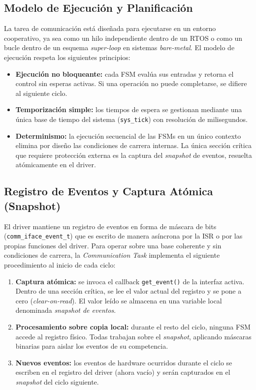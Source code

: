\subsection{Modelo de Ejecución y Planificación}
\label{subsec:modelo-ejecucion}

La tarea de comunicación está diseñada para ejecutarse en un entorno cooperativo, ya sea como un hilo independiente dentro de un RTOS o como un bucle dentro de un esquema \textit{super-loop} en sistemas \textit{bare-metal}. El modelo de ejecución respeta los siguientes principios:

\begin{itemize}
    \item \textbf{Ejecución no bloqueante:} cada FSM evalúa sus entradas y retorna el control sin esperas activas. Si una operación no puede completarse, se difiere al siguiente ciclo.
    \item \textbf{Temporización simple:} los tiempos de espera se gestionan mediante una única base de tiempo del sistema (\texttt{sys\_tick}) con resolución de milisegundos.
    \item \textbf{Determinismo:} la ejecución secuencial de las FSMs en un único contexto elimina por diseño las condiciones de carrera internas. La única sección crítica que requiere protección externa es la captura del \textit{snapshot} de eventos, resuelta atómicamente en el driver.
\end{itemize}

\subsection{Registro de Eventos y Captura Atómica (Snapshot)}
\label{subsec:snapshot}

El driver mantiene un registro de eventos en forma de máscara de bits (\texttt{comm\_iface\_event\_t}) que es escrito de manera asíncrona por la ISR o por las propias funciones del driver. Para operar sobre una base coherente y sin condiciones de carrera, la \textit{Communication Task} implementa el siguiente procedimiento al inicio de cada ciclo:

\begin{enumerate}
    \item \textbf{Captura atómica:} se invoca el callback \texttt{get\_event()} de la interfaz activa. Dentro de una sección crítica, se lee el valor actual del registro y se pone a cero (\textit{clear-on-read}). El valor leído se almacena en una variable local denominada \textit{snapshot de eventos}.
    \item \textbf{Procesamiento sobre copia local:} durante el resto del ciclo, ninguna FSM accede al registro físico. Todas trabajan sobre el \textit{snapshot}, aplicando máscaras binarias para aislar los eventos de su competencia.
    \item \textbf{Nuevos eventos:} los eventos de hardware ocurridos durante el ciclo se escriben en el registro del driver (ahora vacío) y serán capturados en el \textit{snapshot} del ciclo siguiente.
\end{enumerate}

